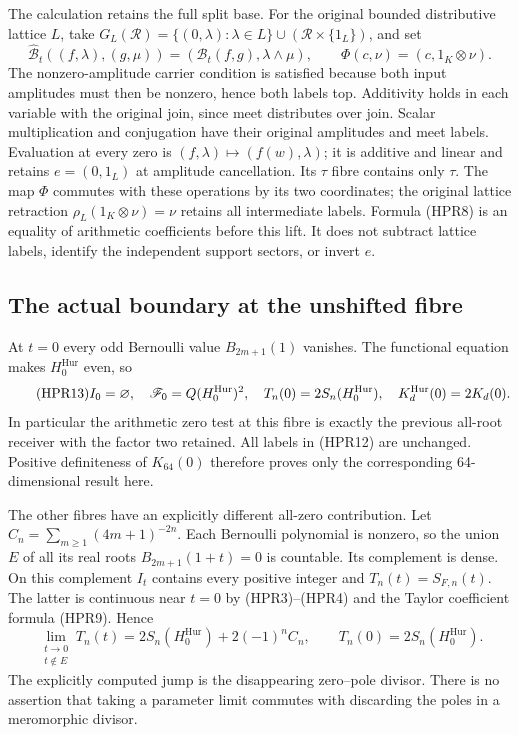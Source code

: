 The calculation retains the full split base. For the original bounded
distributive lattice $L$, take
$G_L(\mathcal R)=\{(0,\lambda):\lambda\in L\}
\cup(\mathcal R\times\{1_L\})$, and set
\begin{equation}\tag{HPR12}
 \widehat{\mathcal B}_t((f,\lambda),(g,\mu))
     =(\mathcal B_t(f,g),\lambda\wedge\mu),\qquad
 \Phi(c,\nu)=(c,1_K\otimes\nu).
\end{equation}
The nonzero-amplitude carrier condition is satisfied because both
input amplitudes must then be nonzero, hence both labels top.
Additivity holds in each variable with the original join, since
meet distributes over join. Scalar multiplication and conjugation
have their original amplitudes and meet labels. Evaluation at every
zero is $(f,\lambda)\mapsto(f(w),\lambda)$; it is additive and
linear and retains $e=(0,1_L)$ at amplitude cancellation. Its
$\tau$ fibre contains only $\tau$.
The map $\Phi$ commutes with these operations by its two coordinates;
the original lattice retraction $\rho_L(1_K\otimes\nu)=\nu$
retains all intermediate labels. Formula (HPR8) is an equality
of arithmetic coefficients before this lift. It does not subtract
lattice labels, identify the independent support sectors, or invert $e$.

\subsection{The actual boundary at the unshifted fibre}

At $t=0$ every odd Bernoulli value $B_{2m+1}(1)$ vanishes.
The functional equation makes $H_0^{\mathrm{Hur}}$ even, so
\begin{equation}\tag{HPR13}
 I_0=\varnothing,\quad \mathscr F_0=Q (H_0^{\mathrm{Hur}})^2,\quad
 T_n(0)=2S_n(H_0^{\mathrm{Hur}}),\quad
 K_d^{\rm Hur}(0)=2K_d(0).
\end{equation}
In particular the arithmetic zero test at this fibre is exactly the
previous all-root receiver with the factor two retained. All labels
in (HPR12) are unchanged. Positive definiteness of $K_{64}(0)$
therefore proves only the corresponding 64-dimensional result here.

The other fibres have an explicitly different all-zero contribution.
Let $C_n=\sum_{m\ge1}(4m+1)^{-2n}$. Each Bernoulli polynomial is
nonzero, so the union $E$ of all its real roots $B_{2m+1}(1+t)=0$
is countable. Its complement is dense. On this complement $I_t$
contains every positive integer and $T_n(t)=S_{F,n}(t)$.
The latter is continuous near $t=0$ by (HPR3)--(HPR4) and the Taylor
coefficient formula (HPR9). Hence
\begin{equation}\tag{HPR14}
 \lim_{\substack{t\to0\\t\notin E}}T_n(t)
       =2S_n(H_0^{\mathrm{Hur}})+2(-1)^n C_n,\qquad
 T_n(0)=2S_n(H_0^{\mathrm{Hur}}).
\end{equation}
The explicitly computed jump is the disappearing zero--pole divisor.
There is no assertion that taking a parameter limit commutes with
discarding the poles in a meromorphic divisor.

